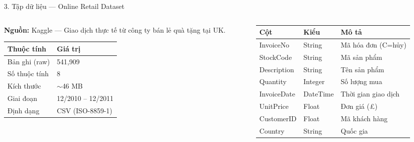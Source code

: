 \documentclass[10pt, aspectratio=169]{beamer}
\begin{document}
\begin{frame}{3. Tập dữ liệu --- Online Retail Dataset}
    \small
    \begin{columns}[T]
        \begin{column}{0.42\textwidth}
            \textbf{Nguồn:} Kaggle --- Giao dịch thực tế từ công ty bán lẻ quà tặng tại UK.
            
            \vspace{0.2cm}
            \begin{tabularx}{\linewidth}{lX}
                \toprule
                \textbf{Thuộc tính} & \textbf{Giá trị} \\
                \midrule
                Bản ghi (raw) & 541,909 \\
                Số thuộc tính & 8 \\
                Kích thước & $\sim$46 MB \\
                Giai đoạn & 12/2010 -- 12/2011 \\
                Định dạng & CSV (ISO-8859-1) \\
                \bottomrule
            \end{tabularx}
        \end{column}
        
        \begin{column}{0.54\textwidth}
            \footnotesize
            \begin{tabularx}{\linewidth}{llX}
                \toprule
                \textbf{Cột} & \textbf{Kiểu} & \textbf{Mô tả} \\
                \midrule
                InvoiceNo & String & Mã hóa đơn (C=hủy) \\
                StockCode & String & Mã sản phẩm \\
                Description & String & Tên sản phẩm \\
                Quantity & Integer & Số lượng mua \\
                InvoiceDate & DateTime & Thời gian giao dịch \\
                UnitPrice & Float & Đơn giá (£) \\
                CustomerID & Float & Mã khách hàng \\
                Country & String & Quốc gia \\
                \bottomrule
            \end{tabularx}
        \end{column}
    \end{columns}
\end{frame}
\end{document}
